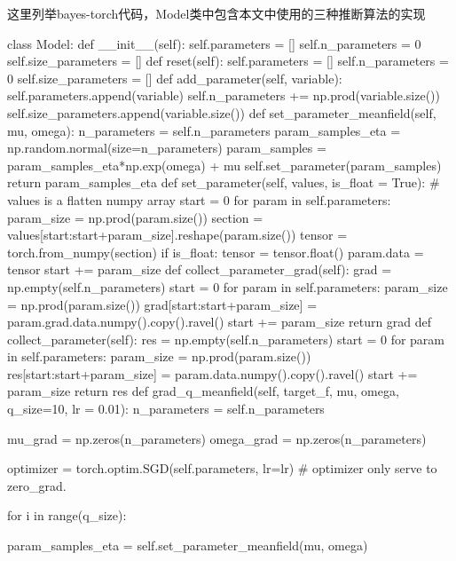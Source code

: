 \documentclass{article}
\begin{document}
这里列举bayes-torch代码，Model类中包含本文中使用的三种推断算法的实现

\begin{python}

class Model:
    def __init__(self):
        self.parameters = []
        self.n_parameters = 0
        self.size_parameters = []
    def reset(self):
        self.parameters = []
        self.n_parameters = 0
        self.size_parameters = []
    def add_parameter(self, variable):
        self.parameters.append(variable)
        self.n_parameters += np.prod(variable.size())
        self.size_parameters.append(variable.size())
    def set_parameter_meanfield(self, mu, omega):
        n_parameters = self.n_parameters
        param_samples_eta = np.random.normal(size=n_parameters)
        param_samples = param_samples_eta*np.exp(omega) + mu
        self.set_parameter(param_samples)
        return param_samples_eta
    def set_parameter(self, values, is_float = True):
        # values is a flatten numpy array
        start = 0
        for param in self.parameters:
            param_size = np.prod(param.size())
            section = values[start:start+param_size].reshape(param.size())
            tensor = torch.from_numpy(section)
            if is_float:
                tensor = tensor.float()
            param.data = tensor
            start += param_size
    def collect_parameter_grad(self):
        grad = np.empty(self.n_parameters)
        start = 0
        for param in self.parameters:
            param_size = np.prod(param.size())
            grad[start:start+param_size] = param.grad.data.numpy().copy().ravel()
            start += param_size
        return grad
    def collect_parameter(self):
        res = np.empty(self.n_parameters)
        start = 0
        for param in self.parameters:
            param_size = np.prod(param.size())
            res[start:start+param_size] = param.data.numpy().copy().ravel()
            start += param_size
        return res
    def grad_q_meanfield(self, target_f, mu, omega, q_size=10, lr = 0.01):
        n_parameters = self.n_parameters
        
        mu_grad = np.zeros(n_parameters)
        omega_grad = np.zeros(n_parameters)
        
        optimizer = torch.optim.SGD(self.parameters, lr=lr)
        # optimizer only serve to zero_grad.
        
        for i in range(q_size):
            
            param_samples_eta = self.set_parameter_meanfield(mu, omega)
            

\end{python}
\end{document}
